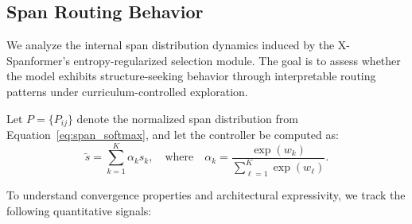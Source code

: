 \subsection{Span Routing Behavior}
\label{sec:span-behavior}

We analyze the internal span distribution dynamics induced by the X-Spanformer’s entropy-regularized selection module. The goal is to assess whether the model exhibits structure-seeking behavior through interpretable routing patterns under curriculum-controlled exploration.

\vspace{0.5em}
\noindent Let \(P = \{P_{ij}\}\) denote the normalized span distribution from Equation~\eqref{eq:span_softmax}, and let the controller be computed as:
\begin{equation}
\tilde{s} = \sum_{k=1}^K \alpha_k s_k, \quad \text{where} \quad \alpha_k = \frac{\exp(w_k)}{\sum_{\ell=1}^K \exp(w_\ell)}.
\label{eq:span_behavior_controller}
\end{equation}

To understand convergence properties and architectural expressivity, we track the following quantitative signals:

